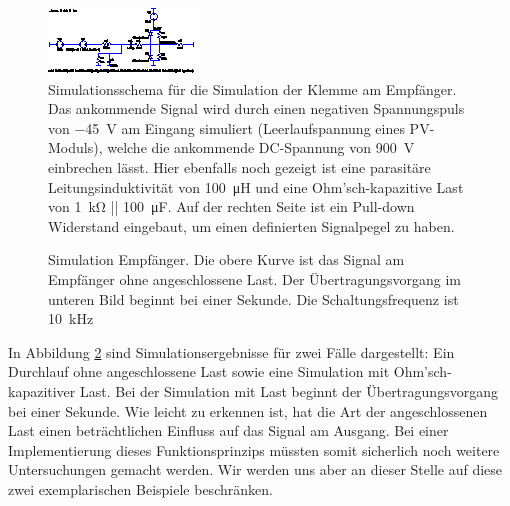 \begin{figure}[h!tb]
    \centering
    \includegraphics[width=\textwidth]{images/ltspice/jac/shortcircuit-recv.eps}
    \caption{
        Simulationsschema f\"ur die Simulation  der Klemme am Empf\"anger. Das
        ankommende  Signal  wird  durch   einen  negativen  Spannungspuls  von
        \SI{-45}{\volt}   am   Eingang   simuliert   (Leerlaufspannung   eines
        PV-Moduls),  welche  die  ankommende DC-Spannung  von  \SI{900}{\volt}
        einbrechen   l\"asst. Hier    ebenfalls   noch   gezeigt    ist   eine
        parasit\"are    Leitungsinduktivit\"at   von    \SI{100}{\micro\henry}
        und   eine   Ohm'sch-kapazitive    Last   von   \SI{1}{\kilo\ohm}   ||
        \SI{100}{\micro\farad}. Auf  der  rechten   Seite  ist  ein  Pull-down
        Widerstand eingebaut, um einen definierten Signalpegel zu haben.%
    }
    \label{fig:ltspice:shortCircuit:receiver}
\end{figure}

\clearpage
\begin{figure}[h!tb]
    \centering
    
    \caption{%
        Simulation   Empf\"anger. Die   obere   Kurve  ist   das   Signal   am
        Empf\"anger  ohne  angeschlossene Last. Der  \"Ubertragungsvorgang  im
        unteren  Bild beginnt  bei einer  Sekunde. Die Schaltungsfrequenz  ist
        \SI{10}{\kilo\hertz}%
    }
    \label{fig:simu:short:recv}
\end{figure}

In Abbildung  \ref{fig:simu:short:recv} sind Simulationsergebnisse  f\"ur zwei
F\"alle  dargestellt: Ein  Durchlauf  ohne   angeschlossene  Last  sowie  eine
Simulation mit  Ohm'sch-kapazitiver Last. Bei der Simulation  mit Last beginnt
der  \"Ubertragungsvorgang  bei einer  Sekunde. Wie  leicht  zu erkennen  ist,
hat  die Art  der  angeschlossenen Last  einen  betr\"achtlichen Einfluss  auf
das  Signal am  Ausgang. Bei  einer  Implementierung dieses  Funktionsprinzips
m\"ussten  somit sicherlich  noch weitere  Untersuchungen gemacht  werden. Wir
werden  uns aber  an dieser  Stelle  auf diese  zwei exemplarischen  Beispiele
beschr\"anken.


